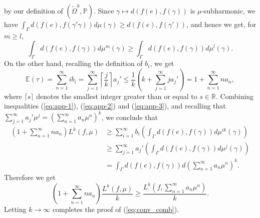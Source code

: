\documentclass[12pt]{amsart}
\numberwithin{equation}{section}
\theoremstyle{plain}
\theoremstyle{definition}
\theoremstyle{remark}
\newcommand{\R}{{\mathbb R}}
\begin{document}
 by our definition of $(\tilde \Omega^k, \mathbb{P})$. 
 Since $\gamma \mapsto d(f(e),f(\gamma))$ is $\mu$-subharmonic, 
 we have 
 $\int_{\Gamma} d(f(e),f(\gamma'\gamma)) d\mu(\gamma) 
 \geq d(f(e),f(\gamma'))$, 
 and hence we get, for $m\geq l$, 
\begin{equation}
\label{eq:app-2}
 \int_{\Gamma} d(f(e),f(\gamma)) d\mu^m(\gamma)
  \geq \int_{\Gamma} d(f(e),f(\gamma)) d\mu^l(\gamma). 
\end{equation}
 On the other hand, recalling the definition of $b_i$, we get 
\begin{equation}
\label{eq:app-3}
 \mathbb{E}(\tau) = \sum_{n=1}^{\infty}i b_i 
  = \sum_{j=1}^{\infty} \left\lceil{\frac{j}{k}}\right\rceil a_j'
   \leq \frac{1}{k} \left(k+ \sum_{j=1}^{\infty}j  a_j' \right)
   = 1+  \sum_{n=1}^{\infty} n a_n, 
\end{equation}
 where $\lceil s \rceil$ denotes the smallest integer greater than or
 equal to $s \in \R$. 
 Combining inequalities (\ref{eq:app-1}), (\ref{eq:app-2}) and
 (\ref{eq:app-3}), and recalling that 
 $\sum_{j=1}^{\infty}a_j'\mu^j=(\sum_{n=1}^{\infty}a_n\mu^n)^k$, 
 we conclude that 
\begin{equation*}
\begin{split}
     \left(1+ \sum_{n=1}^{\infty} n a_n\right) L^k(f,\mu) 
  & \geq \sum_{i=1}^{\infty}b_i \left(
     \int_{\Gamma} d(f(e),f(\gamma)) d\mu^{ik}(\gamma)\right) \\
  & \geq \sum_{j=1}^{\infty} a_j' \left(
      \int_{\Gamma} d(f(e),f(\gamma)) d\mu^j(\gamma)\right) \\
  & = \int_{\Gamma} d(f(e),f(\gamma))
     d(\sum_{n=1}^{\infty}a_n\mu^n)^k. 
\end{split}
\end{equation*}
 Therefore we get
\begin{equation*}
 \left(1 + \sum_{n=1}^{\infty} n a_n\right)
 \frac{L^k(f,\mu)}{k} \geq 
 \frac{L^k(f,\sum_{n=1}^{\infty}a_n\mu^n)}{k}. 
\end{equation*}
 Letting $k\to \infty$ completes the proof of (\ref{eq:conv_comb}). 
\end{document}
